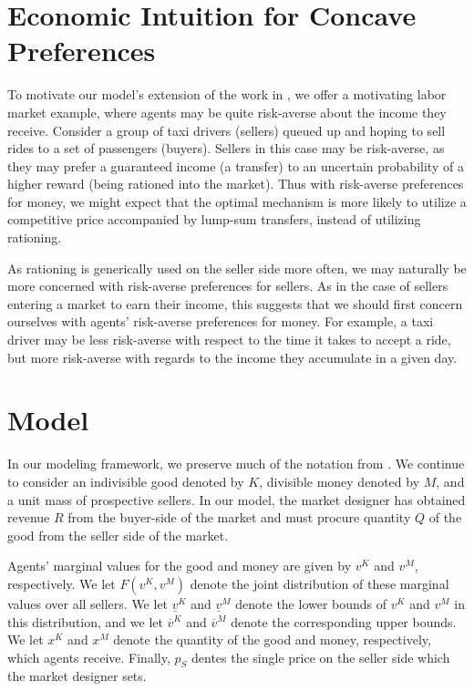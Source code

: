 \documentclass[AER]{AEA}
\begin{document}
\section{Economic Intuition for Concave Preferences}
\label{sec:economic-intuition}

To motivate our model's extension of the work in \cite{dworczak-2020}, we offer a motivating labor market example, where agents may be quite risk-averse about the income they receive. Consider a group of taxi drivers (sellers) queued up and hoping to sell rides to a set of passengers (buyers). Sellers in this case may be risk-averse, as they may prefer a guaranteed income (a transfer) to an uncertain probability of a higher reward (being rationed into the market). Thus with risk-averse preferences for money, we might expect that the optimal mechanism is more likely to utilize a competitive price accompanied by lump-sum transfers, instead of utilizing rationing.

As rationing is generically used on the seller side more often, we may naturally be more concerned with risk-averse preferences for sellers. As in the case of sellers entering a market to earn their income, this suggests that we should first concern ourselves with agents' risk-averse preferences for money. For example, a taxi driver may be less risk-averse with respect to the time it takes to accept a ride, but more risk-averse with regards to the income they accumulate in a given day.

\section{Model}
\label{sec:model}


In our modeling framework, we preserve much of the notation from \cite{dworczak-2020}. We continue to consider an indivisible good denoted by $K$, divisible money denoted by $M$, and a unit mass of prospective sellers. In our model, the market designer has obtained revenue $R$ from the buyer-side of the market and must procure quantity $Q$ of the good from the seller side of the market.

Agents' marginal values for the good and money are given by $v^K$ and $v^M$, respectively. We let $F(v^K, v^M)$ denote the joint distribution of these marginal values over all sellers. We let $\underline{v}^K$ and $\underline{v}^M$ denote the lower bounds of $v^K$ and $v^M$ in this distribution, and we let $\overline{v}^K$ and $\overline{v}^M$ denote the corresponding upper bounds. We let $x^K$ and $x^M$ denote the quantity of the good and money, respectively, which agents receive. Finally, $p_S$ dentes the single price on the seller side which the market designer sets.
\end{document}
